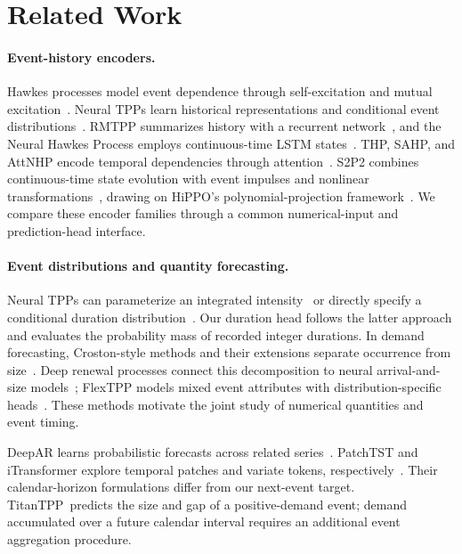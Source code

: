 \documentclass[runningheads]{llncs}
\newcommand{\method}{TitanTPP}
\begin{document}
\section{Related Work}
\paragraph{Event-history encoders.}
Hawkes processes model event dependence through self-excitation and mutual
excitation~\cite{hawkes1971spectra}. Neural TPPs learn historical
representations and conditional event distributions~\cite{shchur2021review}.
RMTPP summarizes history with a recurrent network~\cite{du2016rmtpp}, and the
Neural Hawkes Process employs continuous-time LSTM states~\cite{mei2017nhp}.
THP, SAHP, and AttNHP encode temporal dependencies through
attention~\cite{zuo2020thp,zhang2020sahp,yang2022attnhp}.
S2P2 combines continuous-time state evolution with event impulses and
nonlinear transformations~\cite{chang2025s2p2}, drawing on HiPPO's
polynomial-projection framework~\cite{gu2020hippo}. We compare these encoder
families through a common numerical-input and prediction-head interface.

\paragraph{Event distributions and quantity forecasting.}
Neural TPPs can parameterize an integrated intensity~\cite{omi2019fully} or
directly specify a conditional duration distribution~\cite{shchur2020intensityfree}.
Our duration head follows the latter approach and evaluates the probability
mass of recorded integer durations. In demand forecasting, Croston-style
methods and their extensions separate occurrence from
size~\cite{croston1972forecasting,syntetos2005accuracy,teunter2011obsolescence}.
Deep renewal processes connect this decomposition to neural arrival-and-size
models~\cite{turkmen2021renewal}; FlexTPP models mixed event attributes with
distribution-specific heads~\cite{draxler2025flextpp}. These methods motivate
the joint study of numerical quantities and event timing.

DeepAR learns probabilistic forecasts across related
series~\cite{salinas2020deepar}. PatchTST and iTransformer explore temporal
patches and variate tokens, respectively~\cite{nie2023patchtst,liu2024itransformer}.
Their calendar-horizon formulations differ from our next-event target.
\method\ predicts the size and gap of a positive-demand event; demand
accumulated over a future calendar interval requires an additional event
aggregation procedure.
\end{document}
